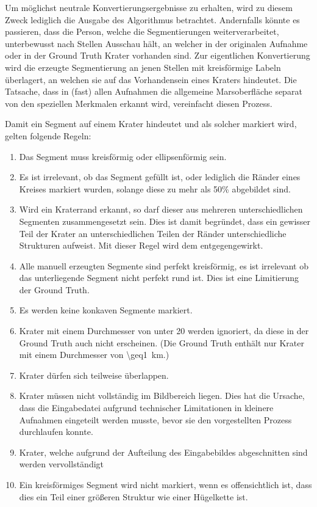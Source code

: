 Um möglichst neutrale Konvertierungsergebnisse zu erhalten, wird zu diesem Zweck lediglich die Ausgabe des Algorithmus betrachtet. Andernfalls könnte es passieren, dass die Person, welche die Segmentierungen weiterverarbeitet, unterbewusst nach Stellen Ausschau hält, an welcher in der originalen Aufnahme oder in der Ground Truth Krater vorhanden sind.
Zur eigentlichen Konvertierung wird die erzeugte Segmentierung an jenen Stellen mit kreisförmige Labeln überlagert, an welchen sie auf das Vorhandensein eines Kraters hindeutet. Die Tatsache, dass in (fast) allen Aufnahmen die allgemeine Marsoberfläche separat von den speziellen Merkmalen erkannt wird, vereinfacht diesen Prozess.

Damit ein Segment auf einem Krater hindeutet und als solcher markiert wird, gelten folgende Regeln:

\begin{enumerate}
	\item Das Segment muss kreisförmig oder ellipsenförmig sein.
	\item Es ist irrelevant, ob das Segment gefüllt ist, oder lediglich die Ränder eines Kreises markiert wurden, solange diese zu mehr als 50\% abgebildet sind.
	\item Wird ein Kraterrand erkannt, so darf dieser aus mehreren unterschiedlichen Segmenten zusammengesetzt sein.  Dies ist damit begründet, dass ein gewisser Teil der Krater an unterschiedlichen Teilen der Ränder unterschiedliche Strukturen aufweist. Mit dieser Regel wird dem entgegengewirkt.
	\item Alle manuell erzeugten Segmente sind perfekt kreisförmig, es ist irrelevant ob das unterliegende Segment nicht perfekt rund ist. Dies ist eine Limitierung der Ground Truth.
	\item Es werden keine konkaven Segmente markiert.
	\item Krater mit einem Durchmesser von unter \SI{20}{\pixel} werden ignoriert, da diese in der Ground Truth auch nicht erscheinen. (Die Ground Truth enthält nur Krater mit einem Durchmesser von \SI{\geq1}{\kilo\meter}.)
	\item Krater dürfen sich teilweise überlappen.
	\item Krater müssen nicht vollständig im Bildbereich liegen. Dies hat die Ursache, dass die Eingabedatei aufgrund technischer Limitationen in kleinere Aufnahmen eingeteilt werden musste, bevor sie den vorgestellten Prozess durchlaufen konnte.
	\item Krater, welche aufgrund der Aufteilung des Eingabebildes abgeschnitten sind werden vervollständigt
	\item Ein kreisförmiges Segment wird nicht markiert, wenn es offensichtlich ist, dass dies ein Teil einer größeren Struktur wie einer Hügelkette ist.
\end{enumerate}

